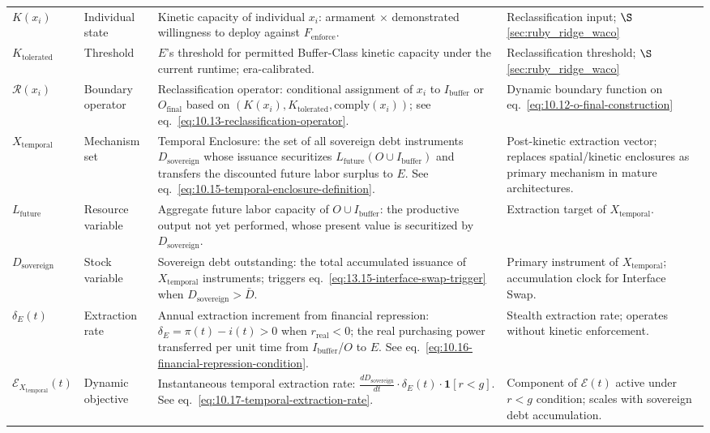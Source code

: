 \begin{longtable}{>{\raggedright}p{2.7cm} >{\raggedright}p{3.2cm} >{\raggedright}p{5.3cm} >{\raggedright\arraybackslash}p{3.3cm}}
$K(x_i)$ & Individual state & Kinetic capacity of individual $x_i$: armament $\times$ demonstrated willingness to deploy against $F_{\text{enforce}}$. & Reclassification input; $\S$\ref{sec:ruby_ridge_waco} \\
$K_{\text{tolerated}}$ & Threshold & $E$'s threshold for permitted Buffer-Class kinetic capacity under the current runtime; era-calibrated. & Reclassification threshold; $\S$\ref{sec:ruby_ridge_waco} \\
$\mathcal{R}(x_i)$ & Boundary operator & Reclassification operator: conditional assignment of $x_i$ to $I_{\text{buffer}}$ or $O_{\text{final}}$ based on $(K(x_i), K_{\text{tolerated}}, \mathrm{comply}(x_i))$; see eq.~\eqref{eq:10.13-reclassification-operator}. & Dynamic boundary function on eq.~\eqref{eq:10.12-o-final-construction} \\
$X_{\text{temporal}}$ & Mechanism set & Temporal Enclosure: the set of all sovereign debt instruments $D_{\text{sovereign}}$ whose issuance securitizes $L_{\text{future}}(O \cup I_{\text{buffer}})$ and transfers the discounted future labor surplus to $E$. See eq.~\eqref{eq:10.15-temporal-enclosure-definition}. & Post-kinetic extraction vector; replaces spatial/kinetic enclosures as primary mechanism in mature architectures. \\
$L_{\text{future}}$ & Resource variable & Aggregate future labor capacity of $O \cup I_{\text{buffer}}$: the productive output not yet performed, whose present value is securitized by $D_{\text{sovereign}}$. & Extraction target of $X_{\text{temporal}}$. \\
$D_{\text{sovereign}}$ & Stock variable & Sovereign debt outstanding: the total accumulated issuance of $X_{\text{temporal}}$ instruments; triggers eq.~\eqref{eq:13.15-interface-swap-trigger} when $D_{\text{sovereign}} > \bar{D}$. & Primary instrument of $X_{\text{temporal}}$; accumulation clock for Interface Swap. \\
$\delta_E(t)$ & Extraction rate & Annual extraction increment from financial repression: $\delta_E = \pi(t) - i(t) > 0$ when $r_{\text{real}} < 0$; the real purchasing power transferred per unit time from $I_{\text{buffer}}$/$O$ to $E$. See eq.~\eqref{eq:10.16-financial-repression-condition}. & Stealth extraction rate; operates without kinetic enforcement. \\
$\mathcal{E}_{X_{\text{temporal}}}(t)$ & Dynamic objective & Instantaneous temporal extraction rate: $\frac{dD_{\text{sovereign}}}{dt} \cdot \delta_E(t) \cdot \mathbf{1}[r < g]$. See eq.~\eqref{eq:10.17-temporal-extraction-rate}. & Component of $\mathcal{E}(t)$ active under $r < g$ condition; scales with sovereign debt accumulation. \\

\end{longtable}
